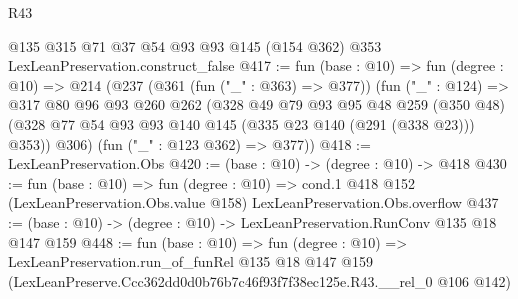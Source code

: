 \begin{lexlean}{R43}
\begin{coremodule}
    @135
    @315
    @71
    @37
    @54
    @93
    @93
    @145
    (@154 @362)
    @353
    LexLeanPreservation.construct_false
@417 := fun (base : @10) =>
  fun (degree : @10) =>
  @214
    (@237
      (@361 (fun ("_" : @363) => @377))
      (fun ("_" : @124) =>
      @317
        @80
        @96
        @93
        @260
        @262
        (@328
          @49
          @79
          @93
          @95
          @48
          @259
          (@350 @48)
          (@328 @77 @54 @93 @93 @140 @145 (@335 @23 @140 (@291 (@338 @23))) @353))
        @306)
      (fun ("_" : @123 @362) => @377))
@418 := LexLeanPreservation.Obs
@420 := (base : @10) -> (degree : @10) -> @418
@430 := fun (base : @10) =>
  fun (degree : @10) =>
  cond.{1} @418 @152 (LexLeanPreservation.Obs.value @158) LexLeanPreservation.Obs.overflow
@437 := (base : @10) -> (degree : @10) -> LexLeanPreservation.RunConv @135 @18 @147 @159
@448 := fun (base : @10) =>
  fun (degree : @10) =>
  LexLeanPreservation.run_of_funRel
    @135
    @18
    @147
    @159
    (LexLeanPreserve.Ccc362dd0d0b76b7c46f93f7f38ec125e.R43.__rel_0 @106 @142)
\end{coremodule}
\end{lexlean}
